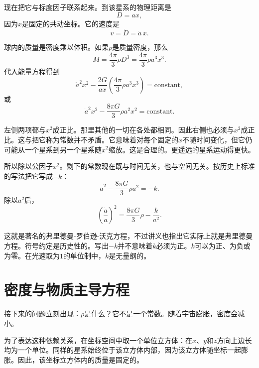 现在把它与标度因子联系起来。到该星系的物理距离是
\begin{equation}
D=ax,
\end{equation}
因为\(x\)是固定的共动坐标。它的速度是
\begin{equation}
v=\dot D=\dot a\,x.
\end{equation}

球内的质量是密度乘以体积。如果\(\rho\)是质量密度，那么
\begin{equation}
M=\frac{4\pi}{3}\rho D^3=\frac{4\pi}{3}\rho a^3x^3.
\end{equation}
代入能量方程得到
\begin{equation}
\dot a^2x^2-\frac{2G}{ax}\left(\frac{4\pi}{3}\rho a^3x^3\right)=\text{constant},
\end{equation}
或
\begin{equation}
\dot a^2x^2-\frac{8\pi G}{3}\rho a^2x^2=\text{constant}.
\end{equation}

左侧两项都与\(x^2\)成正比。那里其他的一切在各处都相同。因此右侧也必须与\(x^2\)成正比。这与把它称为常数并不矛盾。它意味着对每个固定的\(x\)不随时间变化，但它仍可能从一个星系到另一个星系随\(x^2\)缩放。这是合理的。更遥远的星系运动得更快。

所以除以公因子\(x^2\)。剩下的常数现在既与时间无关，也与空间无关。按历史上标准的写法把它写成\(-k\)：
\begin{equation}
\dot a^2-\frac{8\pi G}{3}\rho a^2=-k.
\end{equation}
除以\(a^2\)后，
\begin{equation}
\left(\frac{\dot a}{a}\right)^2=\frac{8\pi G}{3}\rho-\frac{k}{a^2}.
\end{equation}

这就是著名的弗里德曼-罗伯逊-沃克方程，不过讲义也指出它实际上就是弗里德曼方程。符号约定是历史性的。写出\(-k\)并不意味着\(k\)必须为正。\(k\)可以为正、为负或为零。在光速取为\(1\)的单位制中，\(k\)是无量纲的。

\section{密度与物质主导方程}

接下来的问题立刻出现：\(\rho\)是什么？它不是一个常数。随着宇宙膨胀，密度会减小。

为了表达这种依赖关系，在坐标空间中取一个单位立方体：在\(x\)、\(y\)和\(z\)方向上边长均为一个单位。同样的星系始终位于该立方体内部，因为该立方体随坐标一起膨胀。因此，该坐标立方体内的质量是固定的。

